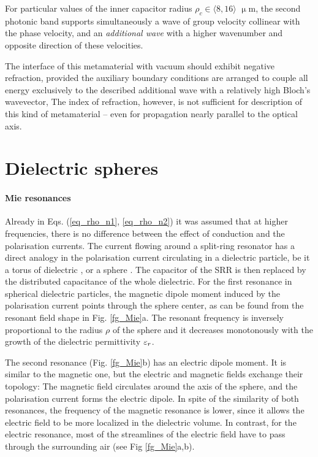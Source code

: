 For particular values of the inner capacitor radius $\rho_c \in \langle8,16\rangle$ $\upmu$m, the second photonic band supports simultaneously a wave of group velocity collinear with the phase velocity, and an \textit{additional wave} with a higher wavenumber and opposite direction of these velocities. 

The interface of this metamaterial with vacuum should exhibit negative refraction, provided the auxiliary boundary conditions are arranged to couple all energy exclusively to the described additional wave with a relatively high Bloch's wavevector,  The index of refraction, however, is not sufficient for description of this kind of metamaterial -- even for propagation nearly parallel to the optical axis.

\FloatBarrier %
\section{Dielectric spheres} %
\paragraph{Mie resonances}%
Already in Eqs. (\ref{eq_rho_n1}, \ref{eq_rho_n2}) it was assumed that at higher frequencies, there is no difference between the effect of conduction and the polarisation currents. The current flowing around a split-ring resonator has a direct analogy in the polarisation current circulating in a dielectric particle, be it a torus of dielectric \cite{jelinek2009artificial}, or a sphere \cite{obrien2002photonic}. The capacitor of the SRR is then replaced by the distributed capacitance of the whole dielectric. For the first resonance in spherical dielectric particles, the magnetic dipole moment induced by the polarisation current points through the sphere center, as can be found from the resonant field shape in Fig. \ref{fg_Mie}a. The resonant frequency is inversely proportional to the radius $\rho$ of the sphere and it decreases monotonously with the growth of the dielectric permittivity $\varepsilon_r$.

The second resonance (Fig. \ref{fg_Mie}b) has an electric dipole moment. It is similar to the magnetic one, but the electric and magnetic fields exchange their topology: The magnetic field circulates around the axis of the sphere, and the polarisation current forms the electric dipole. In spite of the similarity of both resonances, the frequency of the magnetic resonance is lower, since it allows the electric field to be more localized in the dielectric volume. In contrast, for the electric resonance, most of the streamlines of the electric field have to pass through the surrounding air (see Fig \ref{fg_Mie}a,b).  %

